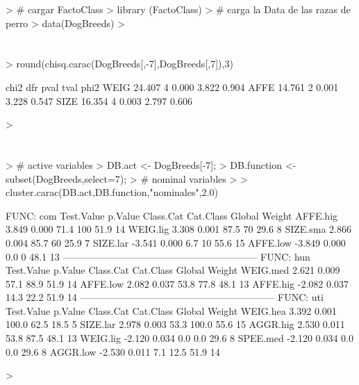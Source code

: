 \documentclass{article}
\begin{document}



\begin{Schunk}
\begin{Sinput}
> # cargar FactoClass
> library (FactoClass)
> # carga la Data de las razas de perro
> data(DogBreeds)
> 
\end{Sinput}
\end{Schunk}

\section{}
\begin{Schunk}
\begin{Sinput}
> round(chisq.carac(DogBreeds[,-7],DogBreeds[,7]),3)
\end{Sinput}
\begin{Soutput}
       chi2 dfr  pval  tval  phi2
WEIG 24.407   4 0.000 3.822 0.904
AFFE 14.761   2 0.001 3.228 0.547
SIZE 16.354   4 0.003 2.797 0.606
\end{Soutput}
\begin{Sinput}
> 
\end{Sinput}
\end{Schunk}

\section{}

\begin{Schunk}
\begin{Sinput}
> # active variables
> DB.act <- DogBreeds[-7];
> DB.function <- subset(DogBreeds,select=7);
>  #  nominal variables
> 
> cluster.carac(DB.act,DB.function,"nominales",2.0) 
\end{Sinput}
\begin{Soutput}
FUNC: com
         Test.Value p.Value Class.Cat Cat.Class Global Weight
AFFE.hig      3.849   0.000      71.4       100   51.9     14
WEIG.lig      3.308   0.001      87.5        70   29.6      8
SIZE.sma      2.866   0.004      85.7        60   25.9      7
SIZE.lar     -3.541   0.000       6.7        10   55.6     15
AFFE.low     -3.849   0.000       0.0         0   48.1     13
------------------------------------------------------------ 
FUNC: hun
         Test.Value p.Value Class.Cat Cat.Class Global Weight
WEIG.med      2.621   0.009      57.1      88.9   51.9     14
AFFE.low      2.082   0.037      53.8      77.8   48.1     13
AFFE.hig     -2.082   0.037      14.3      22.2   51.9     14
------------------------------------------------------------ 
FUNC: uti
         Test.Value p.Value Class.Cat Cat.Class Global Weight
WEIG.hea      3.392   0.001     100.0      62.5   18.5      5
SIZE.lar      2.978   0.003      53.3     100.0   55.6     15
AGGR.hig      2.530   0.011      53.8      87.5   48.1     13
WEIG.lig     -2.120   0.034       0.0       0.0   29.6      8
SPEE.med     -2.120   0.034       0.0       0.0   29.6      8
AGGR.low     -2.530   0.011       7.1      12.5   51.9     14
\end{Soutput}
\begin{Sinput}
> 
\end{Sinput}
\end{Schunk}
\end{document}
